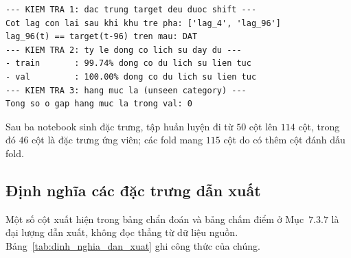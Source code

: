 \begingroup
\par{}\vspace{8pt}
\small\renewcommand{\baselinestretch}{1.0}\selectfont
\begin{verbatim}
--- KIEM TRA 1: dac trung target deu duoc shift ---
Cot lag con lai sau khi khu tre pha: ['lag_4', 'lag_96']
lag_96(t) == target(t-96) tren mau: DAT
--- KIEM TRA 2: ty le dong co lich su day du ---
- train       : 99.74% dong co du lich su lien tuc
- val         : 100.00% dong co du lich su lien tuc
--- KIEM TRA 3: hang muc la (unseen category) ---
Tong so o gap hang muc la trong val: 0
\end{verbatim}
\par\vspace{8pt}
\endgroup
Sau ba notebook sinh đặc trưng, tập huấn luyện đi từ $50$ cột lên $114$ cột, trong đó $46$
cột là đặc trưng ứng viên; các fold mang $115$ cột do có thêm cột đánh dấu fold.

\FloatBarrier
\subsection{Định nghĩa các đặc trưng dẫn xuất}

Một số cột xuất hiện trong bảng chẩn đoán và bảng chấm điểm ở Mục~$7.3.7$ là đại lượng dẫn xuất,
không đọc thẳng từ dữ liệu nguồn. Bảng~\ref{tab:dinh_nghia_dan_xuat} ghi công thức của chúng.

